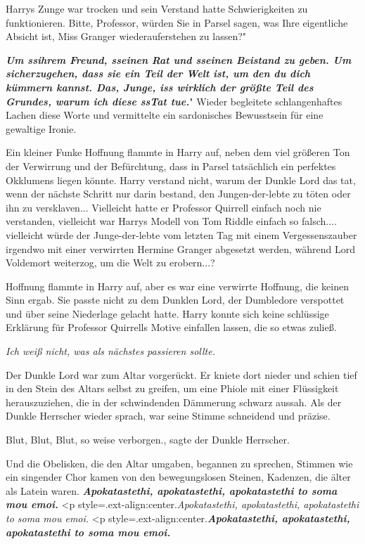 Harrys Zunge war trocken und sein Verstand hatte Schwierigkeiten zu
funktionieren. \glqq{}Bitte, Professor, würden Sie in Parsel sagen, was Ihre
eigentliche Absicht ist, Miss Granger wiederauferstehen zu lassen?"

\glqq{}\textbf{\emph{Um ssihrem Freund, sseinen Rat und sseinen Beistand zu
geben. Um sicherzugehen, dass sie ein Teil der Welt ist, um den du dich kümmern
kannst. Das, Junge, iss wirklich der größte Teil des Grundes, warum ich diese
ssTat tue.}}" Wieder begleitete schlangenhaftes Lachen diese Worte und
vermittelte ein sardonisches Bewusstsein für eine gewaltige Ironie.

Ein kleiner Funke Hoffnung flammte in Harry auf, neben dem viel größeren Ton der
Verwirrung und der Befürchtung, dass in Parsel tatsächlich ein perfektes
Okklumens liegen könnte. Harry verstand nicht, warum der Dunkle Lord das tat,
wenn der nächste Schritt nur darin bestand, den Jungen-der-lebte zu töten oder
ihn zu versklaven... Vielleicht hatte er Professor Quirrell einfach noch nie
verstanden, vielleicht war Harrys Modell von Tom Riddle einfach so falsch....
vielleicht würde der Junge-der-lebte vom letzten Tag mit einem Vergessenszauber
irgendwo mit einer verwirrten Hermine Granger abgesetzt werden, während Lord
Voldemort weiterzog, um die Welt zu erobern...?

Hoffnung flammte in Harry auf, aber es war eine verwirrte Hoffnung, die keinen
Sinn ergab. Sie passte nicht zu dem Dunklen Lord, der Dumbledore verspottet und
über seine Niederlage gelacht hatte. Harry konnte sich keine schlüssige
Erklärung für Professor Quirrells Motive einfallen lassen, die so etwas zuließ.

\emph{Ich weiß nicht, was als nächstes passieren sollte.}

Der Dunkle Lord war zum Altar vorgerückt. Er kniete dort nieder und schien tief
in den Stein des Altars selbst zu greifen, um eine Phiole mit einer Flüssigkeit
herauszuziehen, die in der schwindenden Dämmerung schwarz aussah. Als der Dunkle
Herrscher wieder sprach, war seine Stimme schneidend und präzise.

\glqq{}Blut, Blut, Blut, so weise verborgen.\grqq{}, sagte der Dunkle Herrscher.

Und die Obelisken, die den Altar umgaben, begannen zu sprechen, Stimmen wie ein
singender Chor kamen von den bewegungslosen Steinen, Kadenzen, die älter als
Latein waren.  \textbf{\emph{
Apokatastethi, apokatastethi, apokatastethi to soma mou emoi.} }  <p
style=\grqq{}.ext-align:center\grqq{}.\emph{Apokatastethi, apokatastethi,
apokatastethi to soma mou emoi.}   <p
style=\grqq{}.ext-align:center\grqq{}.\textbf{\emph{Apokatastethi,
apokatastethi, apokatastethi to soma mou emoi.} }

